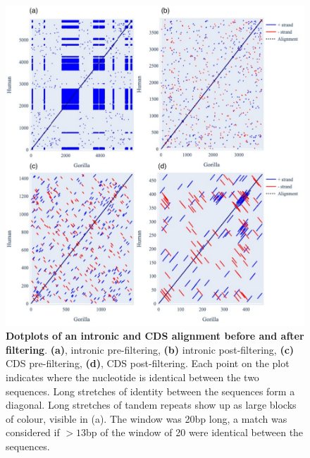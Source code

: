 \begin{figure}[htbp]
\centering
\includegraphics[width=\textwidth]{figures/diagrams/primate_dotplots.pdf}
\caption{\textbf{Dotplots of an intronic and CDS alignment before and after filtering}. \textbf{(a)}, intronic pre-filtering, \textbf{(b)} intronic post-filtering, \textbf{(c)} CDS pre-filtering, \textbf{(d)}, CDS post-filtering. Each point on the plot indicates where the nucleotide is identical between the two sequences. Long stretches of identity between the sequences form a diagonal. Long stretches of tandem repeats show up as large blocks of colour, visible in (a). The window was 20bp long, a match was considered if $>13$bp of the window of 20 were identical between the sequences. }
\label{fig:dotplots}
\end{figure}
